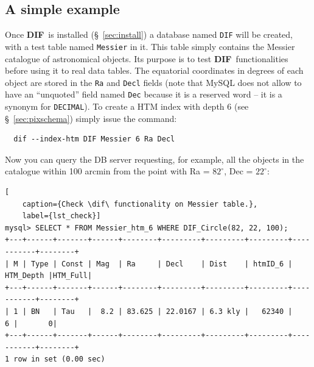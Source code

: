 \documentclass[10pt,titlepage]{article}
\def\deg{^\circ}
\newcommand{\dif}{\textbf{\small DIF}}
\begin{document}
\subsection{A simple example}
Once \dif\ is installed (\S\ \ref{sec:install}) a database named
{\tt DIF} will be created, with a test table named {\tt Messier}
in it. This
table simply contains the Messier catalogue of astronomical objects. Its purpose
is to test \dif\ functionalities before using it to real data tables. The
equatorial coordinates in degrees of each object are stored in the
{\tt Ra} and {\tt Decl} fields (note that MySQL does not allow to have an
``unquoted'' field named {\tt Dec} because it is a reserved word -- it is a synonym for
{\tt DECIMAL}). To create a HTM index with depth 6
(see \S\ \ref{sec:pixschema}) simply issue the command:
\begin{verbatim}
  dif --index-htm DIF Messier 6 Ra Decl
\end{verbatim}
Now you can query the DB server requesting, for example, all the objects in
the catalogue within 100 arcmin from the point with Ra = $82\deg$,
Dec = $22\deg$:
\begin{lstlisting}[
    caption={Check \dif\ functionality on Messier table.},
    label={lst_check}]
mysql> SELECT * FROM Messier_htm_6 WHERE DIF_Circle(82, 22, 100);
+---+------+-------+------+--------+---------+---------+---------+-----------+--------+
| M | Type | Const | Mag  | Ra     | Decl    | Dist    | htmID_6 | HTM_Depth |HTM_Full|
+---+------+-------+------+--------+---------+---------+---------+-----------+--------+
| 1 | BN   | Tau   |  8.2 | 83.625 | 22.0167 | 6.3 kly |   62340 |         6 |       0|
+---+------+-------+------+--------+---------+---------+---------+-----------+--------+
1 row in set (0.00 sec)
\end{lstlisting}
%

\end{document}
